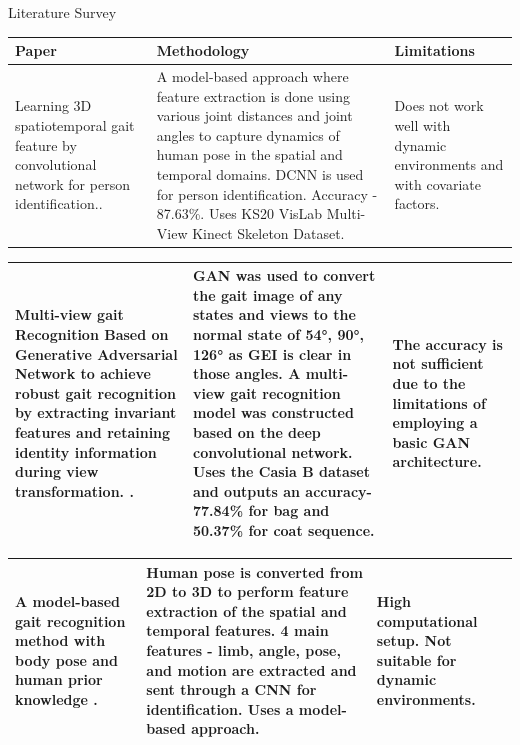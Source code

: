 \documentclass[xcolor=dvipsnames]{beamer}
\begin{document}
\begin{frame}{Literature Survey}

\begin{table}
  \centering
  
  \tiny %

  \begin{tabular}{|p{3cm}|p{5cm}|p{3cm}|}
  \hline
    Paper & Methodology & Limitations \\
    \hline
    Learning 3D spatiotemporal gait feature by convolutional network for person identification.\cite{huynh2020}.&
    A model-based approach where feature extraction is done using various joint distances and joint angles to capture dynamics of human pose in the spatial and temporal domains. DCNN is used for person identification. Accuracy -  87.63\%. Uses  KS20 VisLab Multi-View Kinect Skeleton Dataset. &
    Does not work well with dynamic environments and with covariate factors.\\
    \hline
    
  \end{tabular}
  
   \begin{tabular}{|p{3cm}|p{5cm}|p{3cm}|}
    Multi-view gait Recognition Based on Generative Adversarial Network to achieve robust gait recognition by extracting invariant features and retaining identity information during view transformation. \cite{wen2022}.&
    GAN was used to convert the gait image of any states and views to the normal state of 54°, 90°, 126° as GEI is clear in those angles. A multi-view gait recognition model was constructed based on the deep convolutional network. Uses the Casia B dataset and outputs an accuracy- 77.84\% for bag and 50.37\% for coat sequence.&
    The accuracy is not sufficient due to the limitations of employing a basic GAN architecture.\\
    \hline
  \end{tabular}

  \begin{tabular}{|p{3cm}|p{5cm}|p{3cm}|}
    A model-based gait recognition method with body pose and human prior knowledge \cite{liao2020}.&
    Human pose is converted from 2D to 3D to perform feature extraction of the spatial and temporal features. 4 main features - limb, angle, pose, and motion are extracted and sent through a CNN for identification. Uses a model-based approach.&
    High computational setup. Not suitable for dynamic environments.  \\
    \hline
  \end{tabular}


\end{table}
\end{frame}
\end{document}
